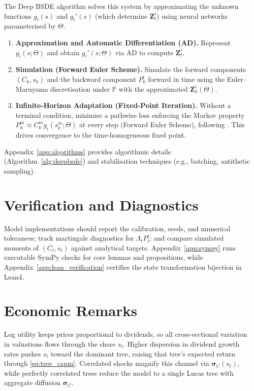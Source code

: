 ﻿\documentclass[11pt,letterpaper,oneside]{article}
\numberwithin{equation}{section}
\newcommand{\1}{\mathbf{1}}
\begin{document}
The Deep BSDE algorithm \cite{han2018solving} solves this system by approximating the unknown functions $g_i(s)$ and $g_i'(s)$ (which determine $\bm{Z}_t^i$) using neural networks parameterised by $\Theta$.
\begin{enumerate}[leftmargin=1.25em]
  \item \textbf{Approximation and Automatic Differentiation (AD).} Represent $g_i(s;\Theta)$ and obtain $g_i'(s;\Theta)$ via AD to compute $\bm{Z}_t^i$.
  \item \textbf{Simulation (Forward Euler Scheme).} Simulate the forward components $(C_k, s_k)$ and the backward component $P_k^i$ forward in time using the Euler--Maruyama discretisation under $\mathbb{P}$ with the approximated $\bm{Z}_k^i(\Theta)$.
  \item \textbf{Infinite-Horizon Adaptation (Fixed-Point Iteration).} Without a terminal condition, minimise a pathwise loss enforcing the Markov property $P_k^m \approx C_k^m g_i(s_k^m;\Theta)$ at every step (Forward Euler Scheme), following \cite{huang2025probabilistic}. This drives convergence to the time-homogeneous fixed point.
\end{enumerate}
Appendix~\ref{app:algorithms} provides algorithmic details (Algorithm~\ref{alg:deepbsde}) and stabilisation techniques (e.g., batching, antithetic sampling).

\section{Verification and Diagnostics}\label{sec:verification}

Model implementations should report the calibration, seeds, and numerical tolerances; track martingale diagnostics for $\Lambda_t P_t^i$; and compare simulated moments of $(C_t,s_t)$ against analytical targets. Appendix~\ref{app:sympy} runs executable SymPy checks for core lemmas and propositions, while Appendix~\ref{app:lean_verification} certifies the state transformation bijection in Lean4.

\section{Economic Remarks}
Log utility keeps prices proportional to dividends, so all cross-sectional variation in valuations flows through the share $s_t$. Higher dispersion in dividend growth rates pushes $s_t$ toward the dominant tree, raising that tree's expected return through \eqref{eq:tree_capm}. Correlated shocks magnify this channel via $\bm{\sigma}_C(s_t)$, while perfectly correlated trees reduce the model to a single Lucas tree with aggregate diffusion $\bm{\sigma}_C$.
\end{document}
